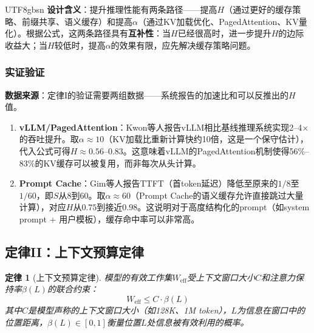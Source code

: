 \documentclass[11pt,a4paper]{article}
\newtheorem{law}{定律}[section]
\begin{document}
\begin{CJK*}{UTF8}{gbsn}
\textbf{设计含义}：提升推理性能有两条路径——提高$H$（通过更好的缓存策略、前缀共享、语义缓存\cite{gim2024promptcache}）和提高$\alpha$（通过KV加载优化、PagedAttention\cite{kwon2023pagedattention}、KV量化\cite{hooper2024kvquant}）。根据公式，这两条路径具有\textbf{互补性}：当$H$已经很高时，进一步提升$H$的边际收益大；当$H$较低时，提高$\alpha$的效果有限，应先解决缓存策略问题。

\subsubsection{实证验证}

\textbf{数据来源}：定律I的验证需要两组数据——系统报告的加速比和可以反推出的$H$值。

\begin{enumerate}[nosep]
\item \textbf{vLLM/PagedAttention}：Kwon等人报告vLLM相比基线推理系统实现2--4$\times$的吞吐提升\cite{kwon2023pagedattention}。取$\alpha \approx 10$（KV加载比重新计算快约10倍，这是一个保守估计），代入公式可得$H \approx 0.56$--$0.83$。这意味着vLLM的PagedAttention机制使得56\%--83\%的KV缓存可以被复用，而非每次从头计算。

\item \textbf{Prompt Cache}：Gim等人报告TTFT（首token延迟）降低至原来的$1/8$至$1/60$\cite{gim2024promptcache}，即$S$从8到60。取$\alpha \approx 60$（Prompt Cache的语义缓存允许直接跳过大量计算），对应$H$从$0.75$到接近$0.98$。这说明对于高度结构化的prompt（如system prompt + 用户模板），缓存命中率可以非常高。
\end{enumerate}

\subsection{定律II：上下文预算定律}
\label{sec:law2}

\begin{law}[上下文预算定律]
模型的有效工作集$W_{\mathrm{eff}}$受上下文窗口大小$C$和注意力保持率$\beta(L)$的联合约束：
\begin{equation}
\label{eq:context}
W_{\mathrm{eff}} \leq C \cdot \beta(L)
\end{equation}
其中$C$是模型声称的上下文窗口大小（如128K、1M token），$L$为信息在窗口中的位置距离，$\beta(L) \in [0,1]$衡量位置$L$处信息被有效利用的概率。
\end{law}


\end{CJK*}
\end{document}
